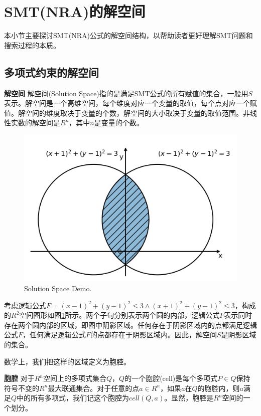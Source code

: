 \section{SMT(NRA)的解空间}
本小节主要探讨SMT(NRA)公式的解空间结构，以帮助读者更好理解SMT问题和搜索过程的本质。
\subsection{多项式约束的解空间}
\begin{definition}{\textbf{解空间}}
解空间(Solution Space)指的是满足SMT公式的所有赋值的集合，一般用$S$表示。解空间是一个高维空间，每个维度对应一个变量的取值，每个点对应一个赋值。解空间的维度取决于变量的个数，解空间的大小取决于变量的取值范围。非线性实数的解空间是$R^n$，其中$n$是变量的个数。
\end{definition}
\begin{example}
    \begin{figure}[]
        \centering
        \includegraphics[width=0.9\columnwidth]{Img/cell1.png}
         {Solution Space Demo.}
        \label{fig:solution_space}
    \end{figure}
    
    考虑逻辑公式$F = (x - 1)^2 + (y - 1)^2 \le 3 \wedge (x + 1)^2 + (y - 1)^2 \le 3$，构成的$R^2$空间图形如图\ref{fig:solution_space}所示。两个子句分别表示两个圆的内部，逻辑公式$F$表示同时存在两个圆内部的区域，即图中阴影区域。任何存在于阴影区域内的点都满足逻辑公式$F$，任何满足逻辑公式$F$的点都存在于阴影区域内。因此，解空间$S$是阴影区域的集合。
\label{ex:solution_space}
\end{example}
    
数学上，我们把这样的区域定义为胞腔。

\begin{definition}{\textbf{胞腔}}
对于$R^n$空间上的多项式集合$Q$，$Q$的一个胞腔(cell)是每个多项式$P \in Q$保持符号不变的$R^n$最大联通集合。对于任意的点$a \in R^n$，如果$a$在$Q$的胞腔内，则$a$满足$Q$中的所有多项式，我们记这个胞腔为$cell(Q, a)$。显然，胞腔是$R^n$空间的一个划分。
\end{definition}

